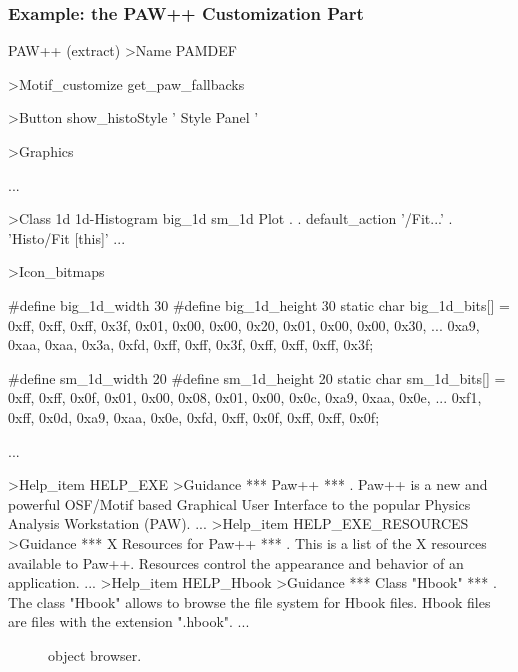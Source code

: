 \subsubsection{Example: the PAW++ \CDF{} Customization Part}

\begin{XMPt}{PAW++ \CDF{} (extract)}
>Name PAMDEF
 
>Motif_customize get_paw_fallbacks%
 
>Button show_histoStyle  ' Style Panel '
 
>Graphics

...

>Class 1d 1d-Histogram big_1d sm_1d
 Plot                           .  . default_action%
'/Fit...'                       .  'Histo/Fit [this]'
...

>Icon_bitmaps

#define big_1d_width 30
#define big_1d_height 30
static char big_1d_bits[] = {
   0xff, 0xff, 0xff, 0x3f, 0x01, 0x00, 0x00, 0x20, 0x01, 0x00, 0x00, 0x30,
...
   0xa9, 0xaa, 0xaa, 0x3a, 0xfd, 0xff, 0xff, 0x3f, 0xff, 0xff, 0xff, 0x3f};

#define sm_1d_width 20
#define sm_1d_height 20
static char sm_1d_bits[] = {
   0xff, 0xff, 0x0f, 0x01, 0x00, 0x08, 0x01, 0x00, 0x0c, 0xa9, 0xaa, 0x0e,
...
   0xf1, 0xff, 0x0d, 0xa9, 0xaa, 0x0e, 0xfd, 0xff, 0x0f, 0xff, 0xff, 0x0f};

...

>Help_item HELP_EXE
>Guidance
       *** Paw++ ***
.
Paw++ is a new and powerful OSF/Motif based Graphical User Interface
to the popular Physics Analysis Workstation (PAW).
...
>Help_item HELP_EXE_RESOURCES
>Guidance
       *** X Resources for Paw++ ***
.
This is a list of the X resources available to Paw++.
Resources control the appearance and behavior of an application.
...
>Help_item HELP_Hbook
>Guidance
       *** Class "Hbook" ***
.
The class "Hbook" allows to browse the file system for Hbook
files. Hbook files are files with the extension ".hbook".
...
\end{XMPt}



\begin{figure}[tb]
\begin{sideways}
\end{sideways}
\caption{\KUIPMotif{} object browser.
\label{fig-motif-browser}}
\end{figure}

